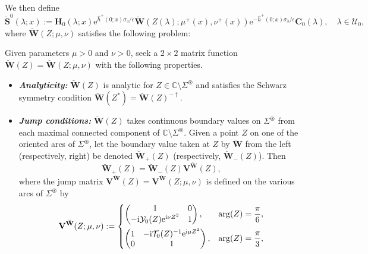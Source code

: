 \documentclass[12pt]{amsart}
\numberwithin{equation}{section}
\newcommand{\ee}{\mathrm{e}}
\newcommand{\ii}{\mathrm{i}}
\newcommand{\SP}{\lambda}
\newcommand{\eps}{\epsilon}
\begin{document}
We then define 
\begin{equation}
	\breve{\mathbf{S}}^{0}(\SP;x) := \mathbf{H}_0(\SP ; x) \ee^{\hat{h}^+(0;x) \sigma_3/\eps} \breve{\mathbf{W}}( Z(\SP) ; \mu^+(x),\nu^+(x)) \ee^{-\hat{h}^+(0;x) \sigma_3/\eps} \mathbf{C}_0(\SP), 
	\quad \SP \in \mathcal{U}_0,
	\label{eq:S0toW0}
\end{equation}
where $\breve{\mathbf{W}}( Z ; \mu, \nu)$ satisfies the following problem:

\begin{myrhp}
Given parameters $\mu>0$ and $\nu>0$, seek a $2\times 2$ matrix function $\breve{\mathbf{W}}(Z)=\breve{\mathbf{W}}(Z;\mu,\nu)$ with the following properties.
\begin{itemize}
\item[]\textit{\textbf{Analyticity:}}  $\breve{\mathbf{W}}(Z)$ is analytic for $Z\in \mathbb{C}\setminus\Sigma^\circledast$ and satisfies the Schwarz symmetry condition $\breve{\mathbf{W}}(Z^*)=\breve{\mathbf{W}}(Z)^{-\dagger}$.
\item[]\textit{\textbf{Jump conditions:}} $\breve{\mathbf{W}}(Z)$ takes continuous boundary values on $\Sigma^\circledast$ from each maximal connected component of $\mathbb{C}\setminus\Sigma^\circledast$.  Given a point $Z$ on one of the oriented arcs of $\Sigma^\circledast$, let the boundary value taken at $Z$ by $\breve{\mathbf{W}}$ from the left (respectively, right) be denoted $\breve{\mathbf{W}}_+(Z)$ (respectively, $\breve{\mathbf{W}}_-(Z)$).  Then 
\begin{equation}
\breve{\mathbf{W}}_+(Z)=\breve{\mathbf{W}}_-(Z)\mathbf{V}^{\breve{\mathbf{W}}}(Z),
\end{equation}
where the jump matrix $\mathbf{V}^{\breve{\mathbf{W}}}(Z)=\mathbf{V}^{\breve{\mathbf{W}}}(Z; \mu, \nu)$ is defined on the various arcs of $\Sigma^\circledast$ by 
\begin{equation}
\mathbf{V}^{\breve{\mathbf{W}}}(Z;\mu,\nu):= \begin{dcases}
	\begin{pmatrix} 1 & 0 \\ -\ii \mathcal{Y}_0(Z) \ee^{\ii \nu Z^2} & 1 \end{pmatrix}, 
	 & \arg(Z) = \frac{\pi}{6}, \\
	\begin{pmatrix} 1 &  -\ii \mathcal{T}_0(Z)^{-1} \ee^{\ii\mu Z^2} \\ 0 & 1 \end{pmatrix},
	 & \arg(Z) = \frac{\pi}{3}, \\

\end{dcases}
\end{equation}
\end{itemize}
\end{myrhp}
\end{document}
